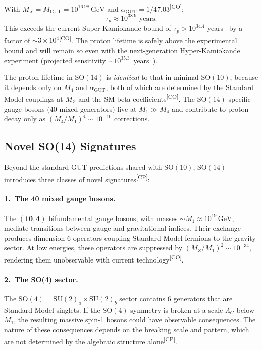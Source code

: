 \documentclass[aps,prd,twocolumn,showpacs,preprintnumbers,superscriptaddress,floatfix]{revtex4-2}
\newcommand{\GeV}{\,\mathrm{GeV}}
\newcommand{\CO}{\textsuperscript{[CO]}}
\newcommand{\CP}{\textsuperscript{[CP]}}
\begin{document}
With $M_X = M_\text{GUT} = 10^{16.98}\GeV$ and
$\alpha_\text{GUT} = 1/47.03$\CO:
\begin{equation}\label{eq:tau}
  \tau_p \approx 10^{38.9} \text{ years}.
\end{equation}
This exceeds the current Super-Kamiokande bound of $\tau_p >
10^{34.4}$ years~\cite{superkamiokande2020} by a factor of
${\sim}3 \times 10^4$\CO.  The proton lifetime is safely above the
experimental bound and will remain so even with the next-generation
Hyper-Kamiokande experiment (projected sensitivity
${\sim}10^{35.3}$~years~\cite{hyperkamiokande2018}).

The proton lifetime in $\mathrm{SO}(14)$ is \emph{identical}
to that in minimal $\mathrm{SO}(10)$, because it depends only on
$M_4$ and $\alpha_\text{GUT}$, both of which are determined by the
Standard Model couplings at $M_Z$ and the SM beta
coefficients\CO.  The $\mathrm{SO}(14)$-specific gauge bosons
(40 mixed generators) live at $M_1 \gg M_4$ and contribute to
proton decay only as $(M_4/M_1)^4 \sim 10^{-10}$ corrections.

\subsection{Novel SO(14) Signatures}

Beyond the standard GUT predictions shared with $\mathrm{SO}(10)$,
$\mathrm{SO}(14)$ introduces three classes of novel signatures\CP:

\paragraph{1.\ The 40 mixed gauge bosons.}
The $(\mathbf{10}, \mathbf{4})$ bifundamental gauge bosons, with
masses $\sim M_1 \approx 10^{19}\GeV$, mediate transitions between
gauge and gravitational indices.  Their exchange produces dimension-6
operators coupling Standard Model fermions to the gravity sector.
At low energies, these operators are suppressed by
$(M_Z/M_1)^2 \sim 10^{-34}$, rendering them unobservable with
current technology\CO.

\paragraph{2.\ The SO(4) sector.}
The $\mathrm{SO}(4) = \mathrm{SU}(2)_a \times \mathrm{SU}(2)_b$
sector contains 6 generators that are Standard Model singlets.
If the $\mathrm{SO}(4)$ symmetry is broken at a scale $\Lambda_G$
below $M_1$, the resulting massive spin-1 bosons could have
observable consequences.  The nature of these consequences depends
on the breaking scale and pattern, which are not determined by
the algebraic structure alone\CP.
\end{document}
